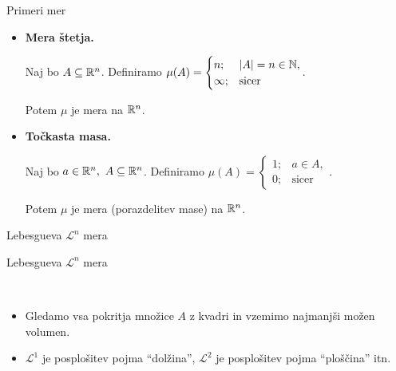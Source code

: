 \documentclass[10pt]{beamer}
\begin{document}
\begin{frame}{Primeri mer}
    \begin{itemize}
        \item \textbf{Mera štetja.}
        
        Naj bo \(A \subseteq \mathbb{R}^n\). Definiramo \(\mu(A) = \begin{cases}
            n; &|A| = n \in \mathbb{N}, \\ \infty; &\text{sicer}
        \end{cases}\).
        
        Potem \(\mu\) je mera na \(\mathbb{R}^n\).
        \item \textbf{Točkasta masa.}
        
        Naj bo \(a \in \mathbb{R}^n, \ A \subseteq \mathbb{R}^n\). Definiramo \(\mu(A) = \begin{cases}
            1; &a \in A, \\ 0; &\text{sicer}
        \end{cases}\).
    
        Potem \(\mu\) je mera (porazdelitev mase) na \(\mathbb{R}^n\).
    \end{itemize}
\end{frame}

\begin{frame}{Lebesgueva \(\mathcal{L}^n\) mera}

\end{frame}

\begin{frame}{Lebesgueva \(\mathcal{L}^n\) mera}
    \begin{opomba} \
        \begin{itemize}
            \item Gledamo vsa pokritja množice \(A\) z kvadri in vzemimo najmanjši možen volumen.
            \item \(\mathcal{L}^1\) je posplošitev pojma "`dolžina"', \(\mathcal{L}^2\) je posplošitev pojma "`ploščina"' itn.
        \end{itemize}            
    \end{opomba}  
\end{frame}
\end{document}
